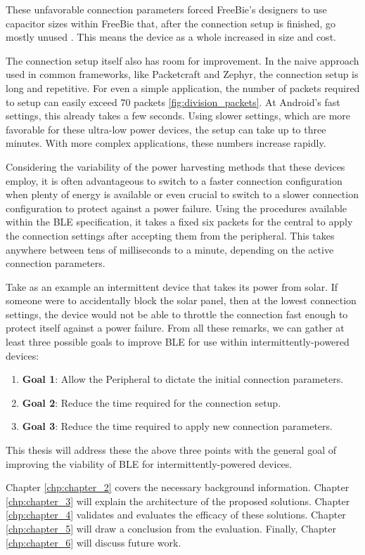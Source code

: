 These unfavorable connection parameters forced FreeBie's designers to use capacitor sizes within FreeBie that, after the connection setup is finished, go mostly unused \cite{freebie}. This means the device as a whole increased in size and cost. 

The connection setup itself also has room for improvement. In the naive approach used in common frameworks, like Packetcraft and Zephyr, the connection setup is long and repetitive. For even a simple application, the number of packets required to setup can easily exceed 70 packets \ref{fig:division_packets}. At Android's fast settings, this already takes a few seconds. Using slower settings, which are more favorable for these ultra-low power devices, the setup can take up to three minutes. With more complex applications, these numbers increase rapidly.

Considering the variability of the power harvesting methods that these devices employ, it is often advantageous to switch to a faster connection configuration when plenty of energy is available or even crucial to switch to a slower connection configuration to protect against a power failure. Using the procedures available within the BLE specification, it takes a fixed six packets for the central to apply the connection settings after accepting them from the peripheral. This takes anywhere between tens of milliseconds to a minute, depending on the active connection parameters. 

Take as an example an intermittent device that takes its power from solar. If someone were to accidentally block the solar panel, then at the lowest connection settings, the device would not be able to throttle the connection fast enough to protect itself against a power failure. From all these remarks, we can gather at least three possible goals to improve BLE for use within intermittently-powered devices:
\begin{enumerate}
    \item \textbf{Goal 1}: Allow the Peripheral to dictate the initial connection parameters.
    \item \textbf{Goal 2}: Reduce the time required for the connection setup.
    \item \textbf{Goal 3}: Reduce the time required to apply new connection parameters.
\end{enumerate}
This thesis will address these the above three points with the general goal of improving the viability of BLE for intermittently-powered devices.

Chapter \ref*{chp:chapter_2} covers the necessary background information. Chapter \ref*{chp:chapter_3} will explain the architecture of the proposed solutions. Chapter \ref*{chp:chapter_4} validates and evaluates the efficacy of these solutions. Chapter \ref{chp:chapter_5} will draw a conclusion from the evaluation. Finally, Chapter \ref{chp:chapter_6} will discuss future work.
